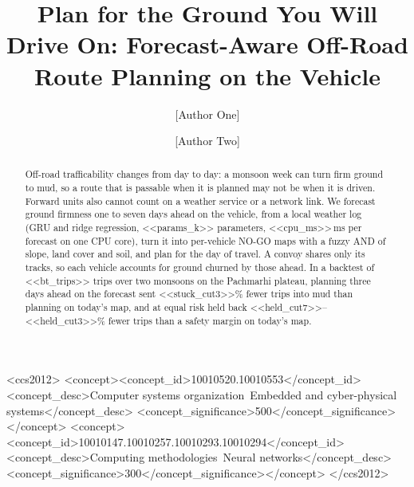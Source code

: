 \documentclass[sigconf]{acmart}
\begin{document}
\title{Plan for the Ground You Will Drive On: Forecast-Aware Off-Road Route Planning on the Vehicle}

\author{[Author One]}
\author{[Author Two]}

\begin{abstract}
Off-road trafficability changes from day to day: a monsoon week can turn firm ground to
mud, so a route that is passable when it is planned may not be when it is driven. Forward
units also cannot count on a weather service or a network link. We forecast ground
firmness one to seven days ahead on the vehicle, from a local weather log (GRU and ridge
regression, <<params_k>> parameters, <<cpu_ms>>\,ms per forecast on one CPU core), turn it into
per-vehicle NO-GO maps with a fuzzy AND of slope, land cover and soil, and plan for the day
of travel. A convoy shares only its tracks, so each vehicle accounts for ground churned by
those ahead. In a backtest of <<bt_trips>> trips over two monsoons on the Pachmarhi plateau,
planning three days ahead on the forecast sent <<stuck_cut3>>\% fewer trips into mud than planning
on today's map, and at equal risk held back <<held_cut7>>--<<held_cut3>>\% fewer trips than a safety margin
on today's map.
\end{abstract}

\begin{CCSXML}
<ccs2012>
<concept><concept_id>10010520.10010553</concept_id>
<concept_desc>Computer systems organization~Embedded and cyber-physical systems</concept_desc>
<concept_significance>500</concept_significance></concept>
<concept><concept_id>10010147.10010257.10010293.10010294</concept_id>
<concept_desc>Computing methodologies~Neural networks</concept_desc>
<concept_significance>300</concept_significance></concept>
</ccs2012>
\end{CCSXML}


\maketitle
\end{document}
